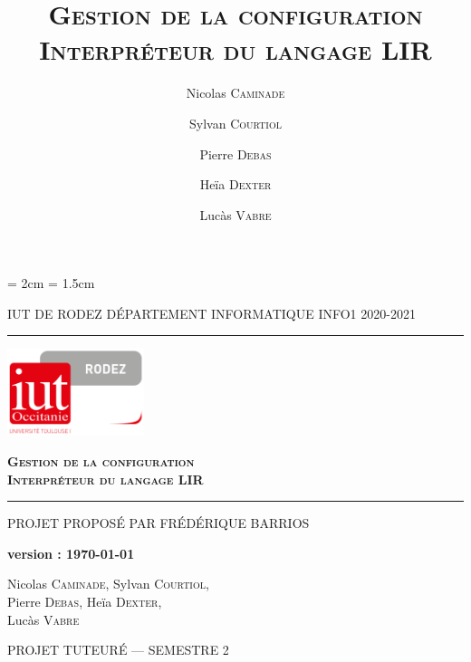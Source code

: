 \pagestyle{fancy}

\title{\textsc{\textbf{Gestion de la configuration
               \\Interpréteur du langage LIR}}}
\date{}
\author{Nicolas \textsc{Caminade} \and Sylvan \textsc{Courtiol} \and Pierre
       \textsc{Debas} \and Heïa \textsc{Dexter} \and Lucàs \textsc{Vabre} }

%

    \cfoot{\thepage}
    \headheight = 2cm
    \headsep = 1.5cm


    \begin{titlepage}
        \selectfont

        \begin{center}\normalsize
            \MakeUppercase{IUT de Rodez \hfill Département informatique \hfill INFO1 2020-2021}
        \end{center}
        \vspace*{0.1cm}
        \hrule
        \vspace*{0.2cm}
        \begin{flushright}
            \includegraphics[width=4cm]{img/logoiut}
        \end{flushright}
        \vspace*{2cm}
        \begin{flushright}\Huge
            \textsc{\textbf{Gestion de la configuration\\Interpréteur du langage LIR}}
        \end{flushright}
        \hrule
        \begin{flushleft}
            \MakeUppercase{Projet proposé par Frédérique Barrios}
        \end{flushleft}
        \vspace*{1cm}
        \begin{center}\normalsize
        	\textbf{version : \today}
        \end{center}
        \vspace*{1cm}
        \begin{center}\Large
            Nicolas \textsc{Caminade}, Sylvan \textsc{Courtiol},\\
            Pierre \textsc{Debas}, Heïa \textsc{Dexter}, \\
            Lucàs \textsc{Vabre}
        \end{center}
        \vfill
        \begin{center}\normalsize
            \MakeUppercase{Projet tuteuré --- Semestre 2}
        \end{center}
    \end{titlepage}

